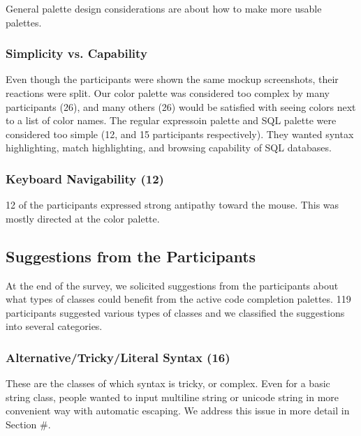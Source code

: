\documentclass[conference]{IEEEtran}
\begin{document}
General palette design considerations are about how to make more usable palettes.

\subsubsection{Simplicity vs. Capability}

Even though the participants were shown the same mockup screenshots, their reactions were split. Our color palette was considered too complex by many participants (26), and many others (26) would be satisfied with seeing colors next to a list of color names. The regular expressoin palette and SQL palette were considered too simple (12, and 15 participants respectively). They wanted syntax highlighting, match highlighting, and browsing capability of SQL databases.

\subsubsection{Keyboard Navigability (12)}

12 of the participants expressed strong antipathy toward the mouse. This was mostly directed at the color palette.

\subsection{Suggestions from the Participants}
At the end of the survey, we solicited suggestions from the participants about what types of classes could benefit from the active code completion palettes. 119 participants suggested various types of classes and we classified the suggestions into several categories.

\subsubsection{Alternative/Tricky/Literal Syntax (16)}
These are the classes of which syntax is tricky, or complex. Even for a basic string class, people wanted to input multiline string or unicode string in more convenient way with automatic escaping. We address this issue in more detail in Section \#.
%
%	
%	
%	
\end{document}
